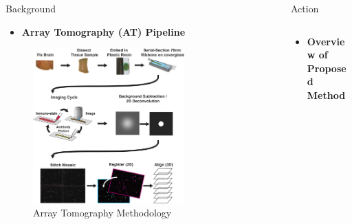 \documentclass[final, table]{beamer}
\newlength{\sepwid}
\newlength{\onecolwid}
\newlength{\twocolwid}
\begin{document}
\begin{frame}[t]
\begin{columns}[t]
\begin{column}{\onecolwid}
\begin{block}{Background}
\begin{itemize} 
\item \textbf{Array Tomography (AT) Pipeline}
\end{itemize} 

\begin{figure}
\centering
\includegraphics[width=0.75\textwidth]{figs/at_diagram3}
\caption{Array Tomography Methodology  \cite{Weiler}}
\end{figure}


\end{block} 


\end{column}

\begin{column}{\sepwid}\end{column}  %
\begin{column}{\twocolwid}



\begin{block}{Action}

\begin{columns}[t]  %

\begin{column}{\onecolwid}

\begin{itemize} 
\item \textbf{Overview of Proposed Method}
\end{itemize} 



\end{column}
\end{columns}
\end{block}
\end{column}
\end{columns}
\end{frame}
\end{document}
